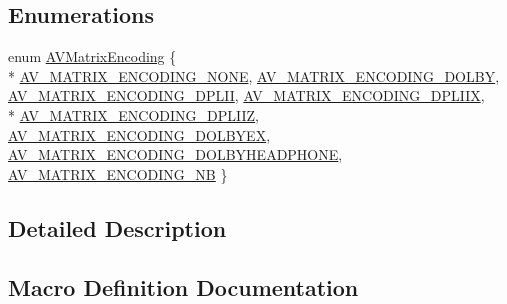\subsection*{Enumerations}
\begin{DoxyCompactItemize}
\item 
enum \hyperlink{group__channel__mask__c_gabd576ea664e3ac5d31f3362064fe13e6}{A\+V\+Matrix\+Encoding} \{ \\*
\hyperlink{group__channel__mask__c_ggabd576ea664e3ac5d31f3362064fe13e6a04179fd7b3339556603020ae88e02793}{A\+V\+\_\+\+M\+A\+T\+R\+I\+X\+\_\+\+E\+N\+C\+O\+D\+I\+N\+G\+\_\+\+N\+O\+NE}, 
\hyperlink{group__channel__mask__c_ggabd576ea664e3ac5d31f3362064fe13e6a0578f715ed49986a6e4c40884c174dbd}{A\+V\+\_\+\+M\+A\+T\+R\+I\+X\+\_\+\+E\+N\+C\+O\+D\+I\+N\+G\+\_\+\+D\+O\+L\+BY}, 
\hyperlink{group__channel__mask__c_ggabd576ea664e3ac5d31f3362064fe13e6a068d30f3ce95f82781b0052bf86bc10e}{A\+V\+\_\+\+M\+A\+T\+R\+I\+X\+\_\+\+E\+N\+C\+O\+D\+I\+N\+G\+\_\+\+D\+P\+L\+II}, 
\hyperlink{group__channel__mask__c_ggabd576ea664e3ac5d31f3362064fe13e6a03124652d3e9efb6ce687971c7abbfa1}{A\+V\+\_\+\+M\+A\+T\+R\+I\+X\+\_\+\+E\+N\+C\+O\+D\+I\+N\+G\+\_\+\+D\+P\+L\+I\+IX}, 
\\*
\hyperlink{group__channel__mask__c_ggabd576ea664e3ac5d31f3362064fe13e6a927893de2c83ddb117fb89dcc579e363}{A\+V\+\_\+\+M\+A\+T\+R\+I\+X\+\_\+\+E\+N\+C\+O\+D\+I\+N\+G\+\_\+\+D\+P\+L\+I\+IZ}, 
\hyperlink{group__channel__mask__c_ggabd576ea664e3ac5d31f3362064fe13e6aa155505a7fb9f2b45778b1d7776dcfb7}{A\+V\+\_\+\+M\+A\+T\+R\+I\+X\+\_\+\+E\+N\+C\+O\+D\+I\+N\+G\+\_\+\+D\+O\+L\+B\+Y\+EX}, 
\hyperlink{group__channel__mask__c_ggabd576ea664e3ac5d31f3362064fe13e6ad9089736c1dd449617a2805d37e502d3}{A\+V\+\_\+\+M\+A\+T\+R\+I\+X\+\_\+\+E\+N\+C\+O\+D\+I\+N\+G\+\_\+\+D\+O\+L\+B\+Y\+H\+E\+A\+D\+P\+H\+O\+NE}, 
\hyperlink{group__channel__mask__c_ggabd576ea664e3ac5d31f3362064fe13e6a3a3acaf62825a3b21c7631ddf1dcc648}{A\+V\+\_\+\+M\+A\+T\+R\+I\+X\+\_\+\+E\+N\+C\+O\+D\+I\+N\+G\+\_\+\+NB}
 \}
\end{DoxyCompactItemize}


\subsection{Detailed Description}


\subsection{Macro Definition Documentation}
